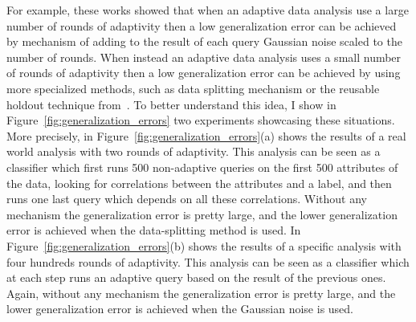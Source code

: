 For example, these works showed that when an adaptive data analysis use a large number of rounds of adaptivity then a low generalization error can be achieved by mechanism of 
adding to the result of each query Gaussian noise scaled to the number of rounds. When instead  an adaptive data analysis uses a small number of rounds of adaptivity then a low generalization error can be achieved by using more specialized methods, such as data splitting mechanism or the reusable holdout technique from~\cite{DworkFHPRR15}.
To better understand this idea, I show in Figure~\ref{fig:generalization_errors} two experiments showcasing these situations. 
More precisely, in Figure~\ref{fig:generalization_errors}(a) shows the results of a real world analysis
with two rounds of adaptivity. 
This analysis can be seen as a classifier which first runs 500 non-adaptive queries on the first 500 attributes of the data, looking for correlations between the attributes and a label, and then runs one last query which depends on all these correlations. 
Without any mechanism the generalization error is pretty large, and the lower generalization error is achieved when the data-splitting method is used. 
In Figure~\ref{fig:generalization_errors}(b) shows the results of a specific analysis
with four hundreds rounds of adaptivity. 
This analysis can be seen as a classifier which at each step runs an adaptive query based on the result of the previous ones. 
Again, without any mechanism the generalization error is pretty large, and the lower generalization error is achieved when the Gaussian noise is used. 
